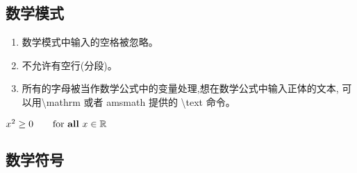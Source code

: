 \documentclass[a4paper]{ctexart}
\begin{document}
    \subsection{数学模式}
    \renewcommand{\labelenumi}{\arabic{enumi}.}
    \begin{enumerate}
        \item 数学模式中输入的空格被忽略。
        \item 不允许有空行(分段)。
        \item 所有的字母被当作数学公式中的变量处理,想在数学公式中输入正体的文本,%
              可以用\textbackslash mathrm 或者 amsmath 提供的 \textbackslash text 命令。
    \end{enumerate}
    $x^2 \geq 0  \qquad
     \text{for \textbf{all} } x \in \mathbb{R}$
    \subsection{数学符号}
\end{document}

